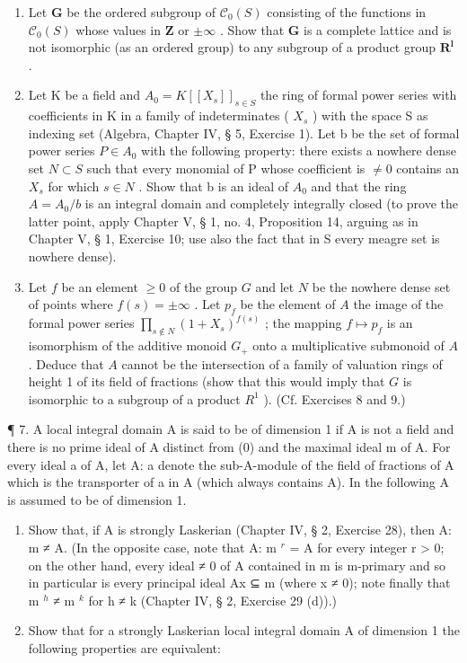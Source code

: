 \begin{enumerate}
\def\labelenumi{(\alph{enumi})}
\setcounter{enumi}{1}
\item
  Let \(\mathbf{G}\) be the ordered subgroup of \(\mathcal{C}_0(S)\) consisting of the functions in \(\mathcal{C}_0(S)\) whose values in \(\mathbf{Z}\) or \(\pm \infty\) . Show that \(\mathbf{G}\) is a complete lattice and is not isomorphic (as an ordered group) to any subgroup of a product group \(\mathbf{R}^{\mathbf{l}}\) .
\item
  Let K be a field and \(A_{0} = K[[X_{s}]]_{s \in S}\) the ring of formal power series with coefficients in K in a family of indeterminates ( \(X_{s}\) ) with the space S as indexing set (Algebra, Chapter IV, § 5, Exercise 1). Let b be the set of formal power series \(P \in A_{0}\) with the following property: there exists a nowhere dense set \(N \subset S\) such that every monomial of P whose coefficient is \(\neq 0\) contains an \(X_{s}\) for which \(s \in N\) . Show that b is an ideal of \(A_{0}\) and that the ring \(A = A_{0}/b\) is an integral domain and completely integrally closed (to prove the latter point, apply Chapter V, § 1, no. 4, Proposition 14, arguing as in Chapter V, § 1, Exercise 10; use also the fact that in S every meagre set is nowhere dense).
\item
  Let \(f\) be an element \(\geqslant 0\) of the group \(G\) and let \(N\) be the nowhere dense set of points where \(f(s) = \pm \infty\) . Let \(p_f\) be the element of \(A\) the image of the formal power series \(\prod_{s \notin N} (1 + X_s)^{f(s)}\) ; the mapping \(f \mapsto p_f\) is an isomorphism of the additive monoid \(G_+\) onto a multiplicative submonoid of \(A\) . Deduce that \(A\) cannot be the intersection of a family of valuation rings of height 1 of its field of fractions (show that this would imply that \(G\) is isomorphic to a subgroup of a product \(R^1\) ). (Cf. Exercises 8 and 9.)
\end{enumerate}

¶ 7. A local integral domain A is said to be of dimension 1 if A is not a field and there is no prime ideal of A distinct from (0) and the maximal ideal m of A. For every ideal a of A, let A: a denote the sub-A-module of the field of fractions of A which is the transporter of a in A (which always contains A). In the following A is assumed to be of dimension 1.

\begin{enumerate}
\def\labelenumi{(\alph{enumi})}
\item
  Show that, if A is strongly Laskerian (Chapter IV, § 2, Exercise 28), then A: m ≠ A. (In the opposite case, note that A: m \(^{r}\) = A for every integer r \textgreater{} 0; on the other hand, every ideal ≠ 0 of A contained in m is m-primary and so in particular is every principal ideal Ax ⊆ m (where x ≠ 0); note finally that m \(^{h}\) ≠ m \(^{k}\) for h ≠ k (Chapter IV, § 2, Exercise 29 (d)).)
\item
  Show that for a strongly Laskerian local integral domain A of dimension 1 the following properties are equivalent:
\end{enumerate}

